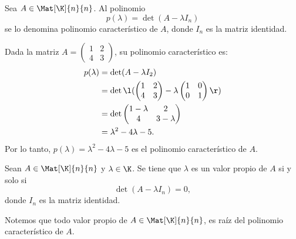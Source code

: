 \documentclass[compacto,10pt]{pubciencias-notas}
\begin{document}
\begin{defi}
Sea $A\in \Mat[\K]{n}{n}$. Al polinomio
\[
    p(\lambda) = \det(A - \lambda I_{n})
\]
se lo denomina polinomio característico de $A$, donde $I_{n}$ es la matriz identidad.
\end{defi}

\begin{ejem}\hspace{0pt} Dada la matriz $A = \begin{pmatrix} 1&2\\4&3 \end{pmatrix}$, su polinomio característico es:
\begin{align*}
    p(\lambda)  &=  \det(A - \lambda I_{2})\\
                &=  \det\l(\begin{pmatrix}1&2\\4&3\end{pmatrix}-\lambda\begin{pmatrix}1&0\\0&1\end{pmatrix}\r)\\
                &=  \det\begin{pmatrix}1-\lambda &2 \\ 4 & 3-\lambda \end{pmatrix}\\
                &= \lambda^2 - 4\lambda - 5.\\
\end{align*}
Por lo tanto, $p(\lambda)= \lambda^2 - 4\lambda - 5$ es el polinomio característico de $A$.
\end{ejem}


\begin{prop}
Sean $A\in \Mat[\K]{n}{n}$ y $\lambda \in \K$. Se tiene que $\lambda$ es un valor propio de $A$ si y solo si
\[
    \det(A - \lambda I_{n}) = 0,
\]
donde $I_{n}$ es la matriz identidad.
\end{prop}

\begin{advertencia}
Notemos que todo valor propio de $A\in\Mat[\K]{n}{n}$, es raíz del polinomio característico de $A$.
\end{advertencia}
\end{document}

